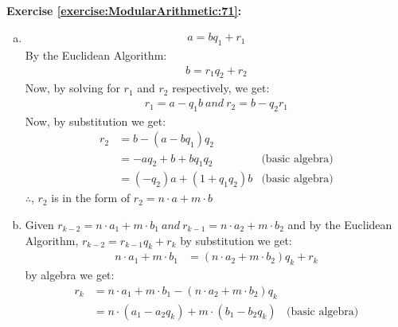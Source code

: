 \noindent\textbf{Exercise \ref{exercise:ModularArithmetic:71}:} %
\begin{enumerate}[(a)]
\item  
\begin{align*}
a = bq_{1} + r_{1}
\end{align*}
By the Euclidean Algorithm:
\begin{align*}
b = r_{1}q_{2} + r_{2} 
\end{align*}
Now, by solving for $r_{1}$ and $r_{2}$ respectively, we get:
\begin{align*}
r_{1} = a - q_{1}b\ and\ r_{2} = b - q_{2}r_{1}
\end{align*}
Now, by substitution we get:
\begin{align*}
r_{2} &= b - (a - bq_{1})q_{2} &\\ 
&= -aq_{2} + b + bq_{1}q_{2} &\text{(basic algebra)}\\
&= (-q_{2})a + (1 + q_{1}q_{2})b &\text{(basic algebra)}
\end{align*}
$\therefore$, $r_{2}$ is in the form of $r_{2} = n\cdot a + m\cdot b$

\item
Given $r_{k-2} = n\cdot a_{1} + m\cdot b_{1}\ and\ r_{k-1} = n\cdot a_{2} + m\cdot b_{2}$ and by the Euclidean Algorithm, $r_{k-2} = r_{k-1}q_{k} + r_{k}$ by substitution we get:
\begin{align*}
n\cdot a_{1} + m\cdot b_{1} &= (n\cdot a_{2} + m\cdot b_{2})q_{k} + r_{k}
\end{align*}
by algebra we get:
\begin{align*}
r_{k} &= n\cdot a_{1} + m\cdot b_{1} - (n\cdot a_{2} + m\cdot b_{2})q_{k} &\\
&= n\cdot(a_{1} - a_{2}q_{k}) + m\cdot (b_{1} - b_{2}q_{k}) &\text{(basic~algebra)}
\end{align*}


\end{enumerate}
